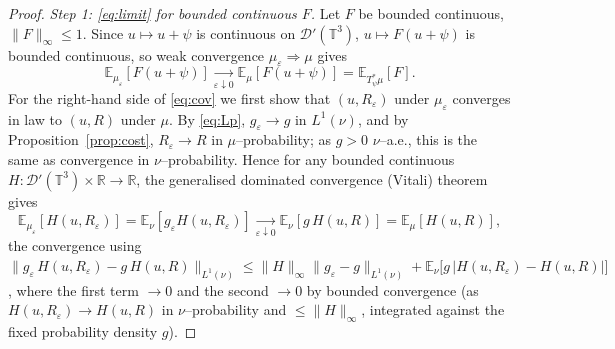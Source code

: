 \documentclass[12pt]{article}
\theoremstyle{definition}
\newcommand{\T}{\mathbb{T}^3}
\newcommand{\R}{\mathbb{R}}
\newcommand{\E}{\mathbb{E}}
\newcommand{\D}{\mathcal{D}'(\T)}
\begin{document}
\begin{proof}
\emph{Step 1: \eqref{eq:limit} for bounded continuous $F$.}
Let $F$ be bounded continuous, $\|F\|_\infty\le1$. Since $u\mapsto u+\psi$ is continuous
on $\D$, $u\mapsto F(u+\psi)$ is bounded continuous, so weak convergence
$\mu_\varepsilon\Rightarrow\mu$ gives
\begin{equation}\label{eq:lhs}
  \E_{\mu_\varepsilon}[F(u+\psi)]\xrightarrow[\varepsilon\downarrow0]{}\E_\mu[F(u+\psi)]
  =\E_{T_\psi^{*}\mu}[F].
\end{equation}
For the right-hand side of \eqref{eq:cov} we first show that $(u,R_\varepsilon)$ under
$\mu_\varepsilon$ converges in law to $(u,R)$ under $\mu$. By \eqref{eq:Lp},
$g_\varepsilon\to g$ in $L^1(\nu)$, and by Proposition~\ref{prop:cost},
$R_\varepsilon\to R$ in $\mu$--probability; as $g>0$ $\nu$--a.e., this is the same as
convergence in $\nu$--probability. Hence for any bounded continuous
$H\colon\D\times\R\to\R$, the generalised dominated convergence (Vitali) theorem gives
\begin{equation}\label{eq:joint}
  \E_{\mu_\varepsilon}[H(u,R_\varepsilon)]=\E_\nu[g_\varepsilon H(u,R_\varepsilon)]
  \xrightarrow[\varepsilon\downarrow0]{}\E_\nu[g\,H(u,R)]=\E_\mu[H(u,R)],
\end{equation}
the convergence using $\|g_\varepsilon\,H(u,R_\varepsilon)-g\,H(u,R)\|_{L^1(\nu)}\le
\|H\|_\infty\|g_\varepsilon-g\|_{L^1(\nu)}+\E_\nu\big[g\,|H(u,R_\varepsilon)-H(u,R)|\big]$,
where the first term $\to0$ and the second $\to0$ by bounded convergence (as
$H(u,R_\varepsilon)\to H(u,R)$ in $\nu$--probability and $\le\|H\|_\infty$, integrated
against the fixed probability density $g$).


\end{proof}
\end{document}
